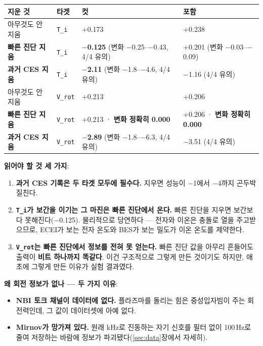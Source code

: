 \documentclass[10pt]{article}
\newcommand{\Ti}{\texttt{T\_i}}
\newcommand{\Vrot}{\texttt{V\_rot}}
\begin{document}
\begin{center}
\begin{tabular}{@{}llll@{}}
\toprule
\textbf{지운 것} & \textbf{타겟} & \textbf{컷} & \textbf{포함} \\
\midrule
아무것도 안 지움 & \Ti & +0.173 & +0.238 \\
\textbf{빠른 진단 지움} & \Ti & \textbf{$-$0.125} (변화 $-$0.25--$-$0.43, 4/4 유의) & +0.201 (변화 $-$0.03--$-$0.09) \\
\textbf{과거 CES 지움} & \Ti & \textbf{$-$2.11} (변화 $-$1.8--$-$4.6, 4/4 유의) & $-$1.16 (4/4 유의) \\
\midrule
아무것도 안 지움 & \Vrot & +0.213 & +0.206 \\
\textbf{빠른 진단 지움} & \Vrot & +0.213 · \textbf{변화 정확히 0.000} & +0.206 · \textbf{변화 정확히 0.000} \\
\textbf{과거 CES 지움} & \Vrot & \textbf{$-$2.89} (변화 $-$1.8--$-$6.3, 4/4 유의) & $-$3.51 (4/4 유의) \\
\bottomrule
\end{tabular}
\end{center}

\textbf{읽어야 할 것 세 가지}:
\begin{enumerate}
\item \textbf{과거 CES 기록은 두 타겟 모두에 필수다.} 지우면 성능이 $-$1에서 $-$4까지
  곤두박질친다.
\item \textbf{\Ti 가 보간을 이기는 그 마진은 빠른 진단에서 온다.} 빠른 진단을 지우면
  보간보다 못해진다($-$0.125). 물리적으로 당연하다 --- 전자와 이온은 충돌로 열을 주고받으므로,
  ECEI가 보는 전자 온도와 BES가 보는 밀도가 이온 온도를 제약한다.
\item \textbf{\Vrot 는 빠른 진단에서 정보를 전혀 못 얻는다.} 빠른 진단 값을 아무리 흔들어도
  출력이 \textbf{비트 하나까지 똑같다}. 이건 구조적으로 그렇게 만든 것이기도 하지만, 애초에
  그렇게 만든 이유가 실험 결과였다.
\end{enumerate}

\textbf{왜 회전 정보가 없나 --- 두 가지 이유}:
\begin{itemize}
\item \textbf{NBI 토크 채널이 데이터에 없다.} 플라즈마를 돌리는 힘은 중성입자빔이 주는
  회전력인데, 그 값이 데이터셋에 아예 없다.
\item \textbf{Mirnov가 망가져 있다.} 원래 kHz로 진동하는 자기 신호를 필터 없이 100\,Hz로
  줄여 저장하는 바람에 정보가 파괴됐다(\ref{sec:data}장에서 자세히).
\end{itemize}
\end{document}
